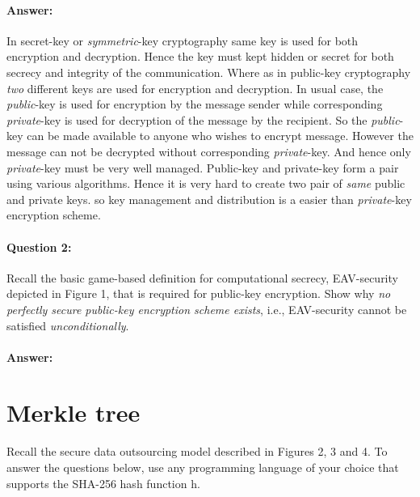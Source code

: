 \documentclass{article}
\begin{document}
    \paragraph{Answer: \newline}
        In secret-key or \emph{symmetric}-key cryptography same key is used for both encryption and decryption. Hence the key must kept hidden or secret for both secrecy and integrity of the communication. \newline
        Where as in public-key cryptography \emph{two} different keys are used for encryption and decryption. In usual case, the \emph{public}-key is used for encryption by the message sender while corresponding \emph{private}-key is used for decryption of the message by the recipient. So the \emph{public}-key can be made available to anyone who wishes to encrypt message. However the message can not be decrypted without corresponding \emph{private}-key. And hence only \emph{private}-key must be very well managed.\newline
        Public-key and private-key form a pair using various algorithms. Hence it is very hard to create two pair of \emph{same} public and private keys. so key management and distribution is a easier than \emph{private}-key encryption scheme.
        
    \paragraph{Question 2:} Recall the basic game-based definition for computational secrecy, EAV-security depicted in Figure 1, that is required for public-key encryption. Show why \emph{no perfectly secure public-key encryption scheme exists}, i.e., EAV-security cannot be satisfied \emph{unconditionally}.
    \paragraph{Answer: \newline}
    

\section{Merkle tree}
    Recall the secure data outsourcing model described in Figures 2, 3 and 4. To answer the questions below, use any programming language of your choice that supports the SHA-256 hash function h.
    
\end{document}
